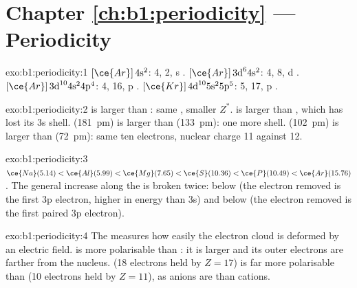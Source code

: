 \section*{Chapter \ref{ch:b1:periodicity} --- Periodicity}

\begin{solution}{exo:b1:periodicity:1}
 $[\ce{Ar}]\,4\text{s}^2$:  4,  2, s . 
$[\ce{Ar}]\,3\text{d}^6 4\text{s}^2$:  4,  8, d . 
$[\ce{Ar}]\,3\text{d}^{10} 4\text{s}^2 4\text{p}^4$:  4,  16, p
.  $[\ce{Kr}]\,4\text{d}^{10} 5\text{s}^2 5\text{p}^5$:  5,
 17, p .
\end{solution}

\begin{solution}{exo:b1:periodicity:2}
 is larger than : same , smaller $Z^{*}$.  is
larger than , which has lost its 3s shell. 
(\qty{181}{pm}) is larger than  (\qty{133}{pm}): one more shell.
 (\qty{102}{pm}) is larger than  (\qty{72}{pm}): same
ten electrons, nuclear charge 11 against 12.
\end{solution}

\begin{solution}{exo:b1:periodicity:3}
$\ce{Na} (5.14) < \ce{Al} (5.99) < \ce{Mg} (7.65) < \ce{S} (10.36) <
\ce{P} (10.49) < \ce{Ar} (15.76)$. The general increase along the 
is broken twice:  below  (the electron removed is the first
3p electron, higher in energy than 3s) and  below  (the
electron removed is the first paired 3p electron).
\end{solution}

\begin{solution}{exo:b1:periodicity:4}
The  measures how easily the electron cloud is deformed by
an electric field.  is more polarisable than : it is larger
and its outer electrons are farther from the nucleus.  (18
electrons held by $Z = 17$) is far more polarisable than  (10
electrons held by $Z = 11$), as anions are than cations.
\end{solution}

